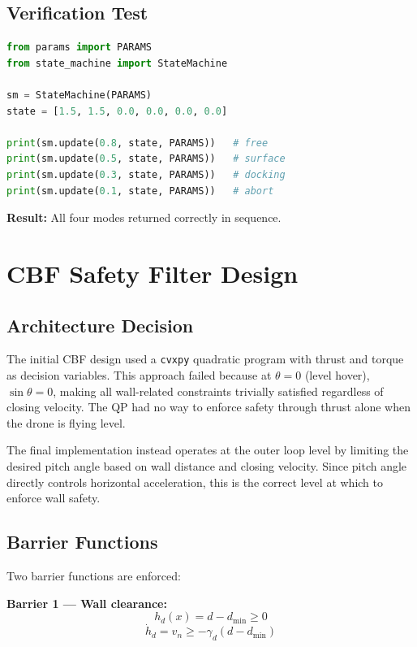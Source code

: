 \documentclass[12pt]{article}
\begin{document}
\subsection{Verification Test}

\begin{lstlisting}[language=Python]
from params import PARAMS
from state_machine import StateMachine

sm = StateMachine(PARAMS)
state = [1.5, 1.5, 0.0, 0.0, 0.0, 0.0]

print(sm.update(0.8, state, PARAMS))   # free
print(sm.update(0.5, state, PARAMS))   # surface
print(sm.update(0.3, state, PARAMS))   # docking
print(sm.update(0.1, state, PARAMS))   # abort
\end{lstlisting}

\textbf{Result:} All four modes returned correctly in sequence.

\section{CBF Safety Filter Design}

\subsection{Architecture Decision}

The initial CBF design used a \texttt{cvxpy} quadratic program with
thrust and torque as decision variables. This approach failed because
at $\theta = 0$ (level hover), $\sin\theta = 0$, making all
wall-related constraints trivially satisfied regardless of closing
velocity. The QP had no way to enforce safety through thrust alone
when the drone is flying level.

The final implementation instead operates at the outer loop level by
limiting the desired pitch angle based on wall distance and closing
velocity. Since pitch angle directly controls horizontal acceleration,
this is the correct level at which to enforce wall safety.

\subsection{Barrier Functions}

Two barrier functions are enforced:

\textbf{Barrier 1 — Wall clearance:}
\begin{equation}
    h_d(x) = d - d_{\min} \geq 0
\end{equation}
\begin{equation}
    \dot{h}_d = v_n \geq -\gamma_d(d - d_{\min})
\end{equation}
\end{document}
